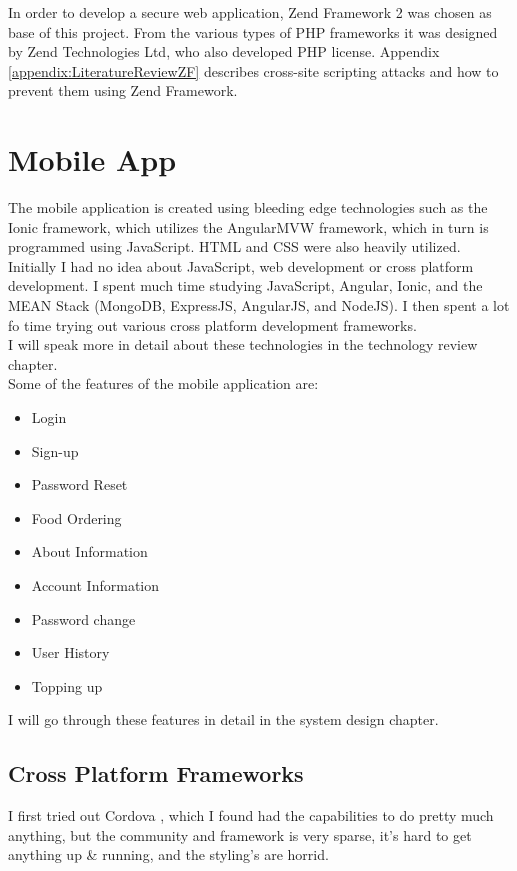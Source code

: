In order to develop a secure web application, Zend Framework 2 was chosen as base of this project. From the various types of PHP frameworks it was designed by Zend Technologies Ltd, who also developed PHP license. Appendix \ref{appendix:LiteratureReviewZF} describes cross-site scripting attacks and how to prevent them using Zend Framework.


\section{Mobile App}
The mobile application is created using bleeding edge technologies such as the Ionic framework, which utilizes the AngularMVW framework, which in turn is programmed using JavaScript. HTML and CSS were also heavily utilized.
\\

Initially I had no idea about JavaScript, web development or cross platform development. I spent much time studying JavaScript, Angular, Ionic, and the MEAN Stack (MongoDB, ExpressJS, AngularJS, and NodeJS). I then spent a lot fo time trying out various cross platform development frameworks.
\\

I will speak more in detail about these technologies in the technology review chapter.
\\

Some of the features of the mobile application are:
\begin{itemize}
\item Login
\item Sign-up
\item Password Reset
\item Food Ordering
\item About Information
\item Account Information
\item Password change
\item User History
\item Topping up
\end{itemize}
I will go through these features in detail in the system design chapter.

\subsection{Cross Platform Frameworks}
I first tried out Cordova \cite{cordova}, which I found had the capabilities to do pretty much anything, but the community and framework is very sparse, it's hard to get anything up \& running, and the styling's are horrid.
\\

